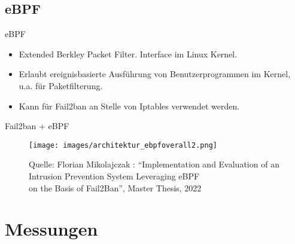 \documentclass[11pt,german,table,dvipsnames]{beamer}
\begin{document}
\subsection{eBPF}

\begin{frame}{eBPF}

\begin{itemize}
    \item Extended Berkley Packet Filter. Interface im Linux Kernel.
    \item Erlaubt ereignisbasierte Ausführung von Benutzerprogrammen im Kernel, u.a. für Paketfilterung.
    \item Kann für Fail2ban an Stelle von Iptables verwendet werden. 
\end{itemize}
    
\end{frame}

\begin{frame}{Fail2ban + eBPF}

\begin{figure}
    \centering
    \texttt{[image: images/architektur\_ebpfoverall2.png]}
    \caption{Quelle: Florian Mikolajczak : ``Implementation and Evaluation of an Intrusion
Prevention System Leveraging eBPF \\ on the
Basis of Fail2Ban'', Master Thesis, 2022 }
\end{figure}

    
\end{frame}

\section{Messungen}
\end{document}
